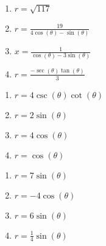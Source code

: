 \begin{multicols}{4}

\begin{enumerate}

\setcounter{enumi}{\value{HW}}

\item $r = \sqrt{117}$
\item $r = \frac{19}{4\cos(\theta) - \sin(\theta)}$
\item $x = \frac{1}{\cos(\theta) - 3\sin(\theta)}$
\item \small $r = \frac{-\sec(\theta)\tan(\theta)}{3}$ \normalsize

\setcounter{HW}{\value{enumi}}

\end{enumerate}

\end{multicols}

\begin{multicols}{4}

\begin{enumerate}

\setcounter{enumi}{\value{HW}}

\item \small $r = 4\csc(\theta)\cot(\theta)$ \normalsize
\item $r=2\sin(\theta)$
\item $r = 4\cos(\theta)$
\item $r = \cos(\theta)$

\setcounter{HW}{\value{enumi}}

\end{enumerate}

\end{multicols}

\begin{multicols}{4}

\begin{enumerate}

\setcounter{enumi}{\value{HW}}

\item $r = 7\sin(\theta)$
\item $r= -4\cos(\theta)$
\item $r = 6\sin(\theta)$
\item $r = \frac{1}{4} \sin(\theta)$

\setcounter{HW}{\value{enumi}}

\end{enumerate}

\end{multicols}

